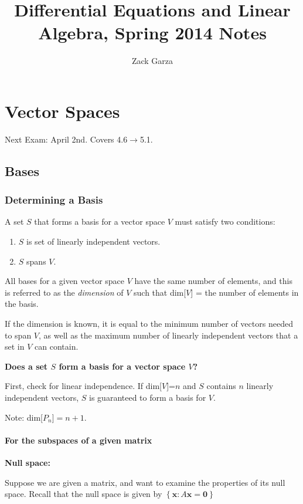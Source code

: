 \documentclass[a4paper,10pt]{report}
\begin{document}
\title{Differential Equations and Linear Algebra, Spring 2014 Notes}
\author{Zack Garza}
\maketitle
\tableofcontents

\chapter{Vector Spaces}
Next Exam: April 2nd. Covers 4.6$\rightarrow$5.1.

\section{Bases}
\subsection{Determining a Basis}
A set $S$ that forms a basis for a vector space $V$ must satisfy two conditions:
\begin{enumerate}
  \item $S$ is set of linearly independent vectors.
  \item $S$ spans $V$.
\end{enumerate}

All bases for a given vector space $V$ have the same number of elements, and this is referred to as the
\textit{dimension} of $V$ such that dim[$V$] = the number of elements in the basis.

If the dimension is known, it is equal to the minimum number of vectors needed to span $V$, as well as the maximum number of linearly independent vectors that a set in $V$ can contain.

\textbf{Does a set $S$ form a basis for a vector space $V$?}

First, check for linear independence. If dim[$V$]=$n$ and $S$ contains $n$ linearly independent vectors, $S$ is guaranteed to form a basis for $V$.

Note: dim[$P_n$]$=n+1$.

\subsubsection{For the subspaces of a given matrix}
\textbf{Null space:}

Suppose we are given a matrix, and want to examine the properties of its null space. Recall that the null space is given by $\left\{ \mathbf{x}: A\mathbf{x} = \mathbf{0}\right\}$%
\end{document}

